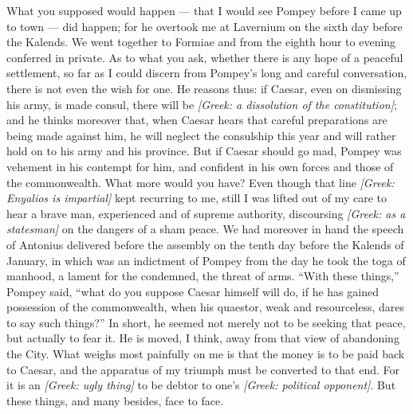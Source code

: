  What you supposed would happen --- that I would see Pompey before I came up to town --- did happen; for he overtook me at Lavernium on the sixth day before the Kalends. We went together to Formiae and from the eighth hour to evening conferred in private. As to what you ask, whether there is any hope of a peaceful settlement, so far as I could discern from Pompey's long and careful conversation, there is not even the wish for one. He reasons thus: if Caesar, even on dismissing his army, is made consul, there will be \textit{[Greek: a dissolution of the constitution]}; and he thinks moreover that, when Caesar hears that careful preparations are being made against him, he will neglect the consulship this year and will rather hold on to his army and his province. But if Caesar should go mad, Pompey was vehement in his contempt for him, and confident in his own forces and those of the commonwealth. What more would you have? Even though that line \textit{[Greek: Enyalios is impartial]} kept recurring to me, still I was lifted out of my care to hear a brave man, experienced and of supreme authority, discoursing \textit{[Greek: as a statesman]} on the dangers of a sham peace. We had moreover in hand the speech of Antonius delivered before the assembly on the tenth day before the Kalends of January, in which was an indictment of Pompey from the day he took the toga of manhood, a lament for the condemned, the threat of arms. ``With these things,'' Pompey said, ``what do you suppose Caesar himself will do, if he has gained possession of the commonwealth, when his quaestor, weak and resourceless, dares to say such things?'' In short, he seemed not merely not to be seeking that peace, but actually to fear it. He is moved, I think, away from that view of abandoning the City. What weighs most painfully on me is that the money is to be paid back to Caesar, and the apparatus of my triumph must be converted to that end. For it is an \textit{[Greek: ugly thing]} to be debtor to one's \textit{[Greek: political opponent]}. But these things, and many besides, face to face.
